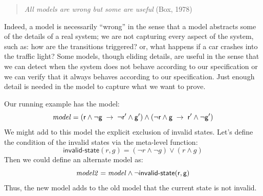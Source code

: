 \begin{quote}
\emph{All models are wrong but some are useful} (Box, 1978)
\end{quote}

\noindent
Indeed, a model is necessarily ``wrong'' in the sense that a model
abstracts some of the details of a real system; we are not
capturing every aspect of the system, such as: how are the transitions
triggered? or, what happens if a car crashes into the traffic light? Some
models, though eliding details, are useful in the sense that we
can detect when the system does not behave according to our
specification or we can verify that it always behaves according to our
specification. Just enough detail is needed in the model to capture what
we want to prove.

Our running example has the model:
\begin{equation*}
\mathit{model} =
(\textsf{r}{} \wedge \neg\textsf{g}{} \; \rightarrow \; \neg\textsf{r}{}' \wedge
\textsf{g}{}')
\wedge
(\neg\textsf{r}{} \wedge \textsf{g}{} \; \rightarrow \; \textsf{r}{}' \wedge \neg\textsf{g}{}')
\end{equation*}
%
We might add to this model the explicit exclusion of invalid
states. Let's define the condition of the invalid states via the meta-level function:
%
\begin{equation*}
\textsf{invalid-state}(r, g) = (\neg r \wedge \neg g) \vee (r \wedge g)
\end{equation*}
%
Then we could define an alternate model as:
%
\begin{equation*}
\mathit{model2} = \mathit{model} \wedge \neg \textsf{invalid-state}(\textsf{r}, \textsf{g})
\end{equation*}
%
Thus, the new model adds to the old model that the current state is not
invalid.

